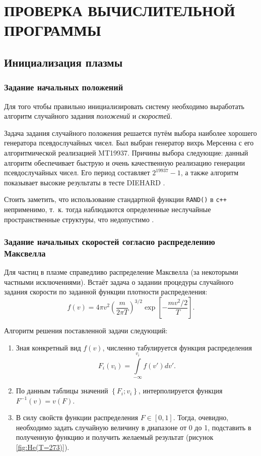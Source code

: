 \chapter{ПРОВЕРКА ВЫЧИСЛИТЕЛЬНОЙ ПРОГРАММЫ} \label{ch4}

\section{Инициализация плазмы}

\subsection{Задание начальных положений}
\label{sec:MT19937}

Для того чтобы правильно инициализировать систему необходимо выработать алгоритм случайного задания \textit{положений} и \textit{скоростей}. 

Задача задания случайного положения решается путём выбора наиболее хорошего генератора псевдослучайных чисел. Был выбран генератор вихрь Мерсенна с его алгоритмической реализацией MT19937. Причины выбора следующие: данный алгоритм обеспечивает быструю и очень качественную реализацию генерации псевдослучайных чисел. Его период составляет $2^{19937}-1$, а также алгоритм показывает высокие результаты в тесте DIEHARD \cite{matsumoto1998mersenne,sriram2006area}.

Стоить заметить, что использование стандартной функции \texttt{RAND()} в \texttt{c++} неприменимо, т.~к. тогда наблюдаются определенные неслучайные пространственные структуры, что недопустимо \cite{habr_rand}.

\subsection{Задание начальных скоростей согласно распределению Максвелла}
\label{sec:HowToMaxwell}

Для частиц в плазме справедливо распределение Максвелла (за некоторыми частными исключениями). Встаёт задача о задании процедуры случайного задания скорости по заданной функции плотности распределения:
\begin{equation}
f(v) = 4 \pi v^2 \left( \frac{m}{2 \pi T} \right)^{3/2} \exp \left[ - \frac{m v^2/2}{T} \right].
\label{eq:maxwell_dist}
\end{equation}

Алгоритм решения поставленной задачи следующий:
\begin{enumerate}
\item Зная конкретный вид $f(v)$, численно табулируется функция распределения
\begin{equation}
F_i (v_i) = \int\limits_{- \infty}^{v_i} f(v') dv'.
\end{equation}
\item По данным таблицы значений $\left\{ F_i ; v_i  \right\}$, интерполируется функция  $F^{-1}(v) = v(F)$.
\item В силу свойств функции распределения $F \in \left[0,1\right]$. Тогда, очевидно, необходимо задать случайную величину в диапазоне от 0 до 1, подставить в полученную функцию и получить желаемый результат (рисунок \ref{fig:He(T=273)}).
\end{enumerate}

